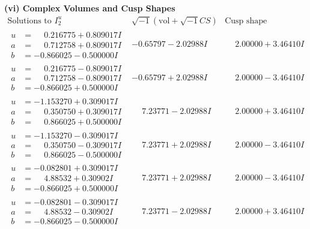\documentclass[1p]{elsarticle_modified}
\theoremstyle{definition}
\newcommand{\I}{\sqrt{-1}}
\begin{document}
\newpage\flushleft \textbf{(vi) Complex Volumes and Cusp Shapes}
$$\begin{array}{c|c|c}  
\text{Solutions to }I^u_{2}& \I (\text{vol} + \sqrt{-1}CS) & \text{Cusp shape}\\
 \hline 
\begin{aligned}
u &= \phantom{-}0.216775 + 0.809017 I \\
a &= \phantom{-}0.712758 + 0.809017 I \\
b &= -0.866025 - 0.500000 I\end{aligned}
 & -0.65797 - 2.02988 I & \phantom{-}2.00000 + 3.46410 I \\ \hline\begin{aligned}
u &= \phantom{-}0.216775 - 0.809017 I \\
a &= \phantom{-}0.712758 - 0.809017 I \\
b &= -0.866025 + 0.500000 I\end{aligned}
 & -0.65797 + 2.02988 I & \phantom{-}2.00000 - 3.46410 I \\ \hline\begin{aligned}
u &= -1.153270 + 0.309017 I \\
a &= \phantom{-}0.350750 + 0.309017 I \\
b &= \phantom{-}0.866025 + 0.500000 I\end{aligned}
 & \phantom{-}7.23771 - 2.02988 I & \phantom{-}2.00000 + 3.46410 I \\ \hline\begin{aligned}
u &= -1.153270 - 0.309017 I \\
a &= \phantom{-}0.350750 - 0.309017 I \\
b &= \phantom{-}0.866025 - 0.500000 I\end{aligned}
 & \phantom{-}7.23771 + 2.02988 I & \phantom{-}2.00000 - 3.46410 I \\ \hline\begin{aligned}
u &= -0.082801 + 0.309017 I \\
a &= \phantom{-}4.88532 + 0.30902 I \\
b &= -0.866025 + 0.500000 I\end{aligned}
 & \phantom{-}7.23771 + 2.02988 I & \phantom{-}2.00000 - 3.46410 I \\ \hline\begin{aligned}
u &= -0.082801 - 0.309017 I \\
a &= \phantom{-}4.88532 - 0.30902 I \\
b &= -0.866025 - 0.500000 I\end{aligned}
 & \phantom{-}7.23771 - 2.02988 I & \phantom{-}2.00000 + 3.46410 I \\ \hline\begin{aligned}

\end{aligned}
\end{array}$$
\end{document}
